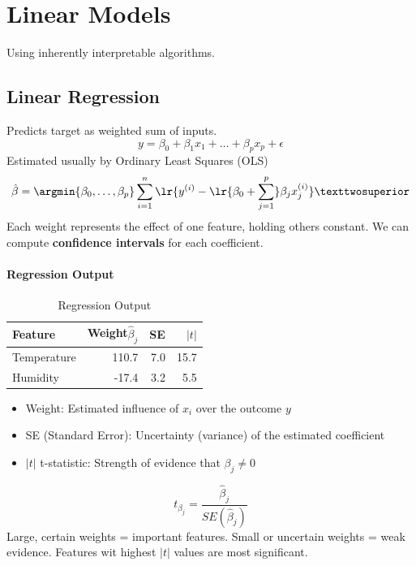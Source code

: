 \section{Linear Models}
Using inherently interpretable algorithms.
\subsection{Linear Regression}
Predicts target as weighted sum of inputs.
\begin{equation}
	y = \beta_0 + \beta_1 x_1 + \dots + \beta_p x_p + \epsilon
	\label{eq:linear_regression}
\end{equation}
Estimated usually by Ordinary Least Squares (OLS)
\begin{equation}
	\hat \beta = \argmin{\beta_0, \dots , \beta_p} \sum_{i=1}^n \lr{y^{(i)} - \lr{\beta_0 + \sum_{j=1}^p}\beta_jx_j^{(i)}}²
	\label{eq:OLS}
\end{equation}
Each weight represents the effect of one feature, holding others constant.
We can compute \textbf{confidence intervals} for each coefficient.
\paragraph{Regression Output}
\begin{table}[H]
	\caption{Regression Output}\label{tab:regression_output}
	\begin{center}
		\begin{tabular}{l|r|r|r}
			\hline
			Feature     & Weight$\hat \beta_j$ & SE  & $|t|$ \\
			\hline
			Temperature & 110.7                & 7.0 & 15.7  \\
			Humidity    & -17.4                & 3.2 & 5.5   \\
			\hline
		\end{tabular}
	\end{center}
\end{table}
\begin{itemize}
	\item Weight: Estimated influence of $x_i$ over the outcome $y$
	\item SE (Standard Error): Uncertainty (variance) of the estimated coefficient
	\item $|t|$ t-statistic: Strength of evidence that $\beta_j \neq 0$
\end{itemize}
\begin{equation}
	t_{\beta_j} = \frac{\hat \beta_j}{SE(\hat \beta_j)}
	\label{eq:t-statistic}
\end{equation}
Large, certain weights = important features. Small or uncertain weights = weak evidence. Features wit highest $|t|$ values are most significant.

